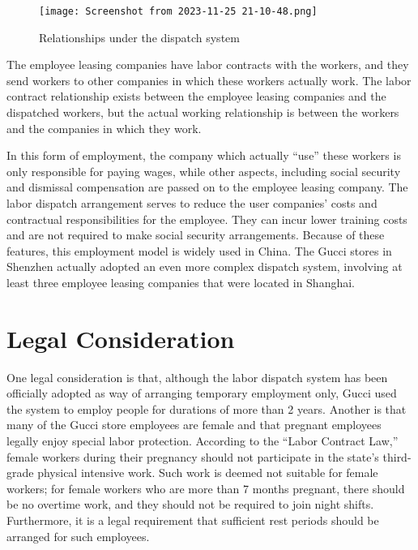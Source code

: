 \documentclass{article}
\begin{document}
\begin{figure}
    \centering
    \texttt{[image: Screenshot from 2023-11-25 21-10-48.png]}
    \caption{Relationships under the dispatch system}
    \label{fig:enter-label}
\end{figure}

The employee leasing companies have labor contracts with the workers, and they send workers to other companies in which these workers actually work. The labor contract relationship exists between the employee leasing companies and the dispatched workers, but the actual working relationship is between the workers and the companies in which they work.

In this form of employment, the company which actually “use” these workers is only responsible for paying wages, while other aspects, including social security and dismissal compensation are passed on to the employee leasing company. The labor dispatch arrangement serves to reduce the user companies’ costs and contractual responsibilities for the employee. They can incur lower training costs and are not required to make social security arrangements. Because of these features, this employment model is widely used in China. The Gucci stores in Shenzhen actually adopted an even more complex dispatch system, involving at least three employee leasing companies that were located in Shanghai.

\section{Legal Consideration}
One legal consideration is that, although the labor dispatch system has been officially adopted as way of arranging temporary employment only, Gucci used the system to employ people for durations of more than 2 years. Another is that many of the Gucci store employees are female and that pregnant employees legally enjoy special labor protection. According to the “Labor Contract Law,” female workers during their pregnancy should not participate in the state’s third-grade physical intensive work. Such work is deemed not suitable for female workers; for female workers who are more than 7 months pregnant, there should be no overtime work, and they should not be required to join night shifts. Furthermore, it is a legal requirement that sufficient rest periods should be arranged for such employees.
\end{document}
